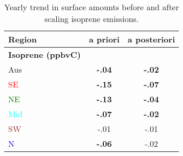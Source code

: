       
      \begin{table}\begin{threeparttable}
        \caption{Yearly trend in surface amounts before and after scaling isoprene emissions.}
        \begin{tabular}{ l | c  c } 
          \toprule
          Region & a priori & a posteriori \\
          \midrule
          \textbf{Isoprene (ppbvC)} & & \\
          Aus                   & \textbf{-.04} & \textbf{-.02}  \\
          \textcolor{red}{SE}   & \textbf{-.15} & \textbf{-.07}  \\
          \textcolor{green}{NE} & \textbf{-.13} & \textbf{-.04}  \\
          \textcolor{cyan}{Mid} & \textbf{-.07} & \textbf{-.02}  \\
          \textcolor{brown}{SW} & -.01      & -.01  \\
          \textcolor{blue}{N}   & \textbf{-.06} & -.02  \\

\end{tabular}
\end{threeparttable}
\end{table}
